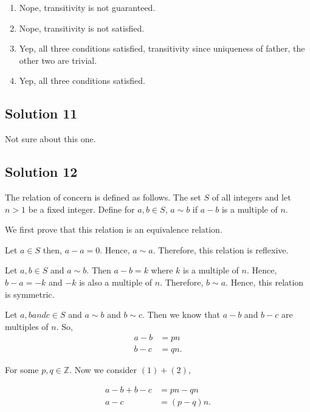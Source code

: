\begin{enumerate}
 \item  Nope, transitivity is not guaranteed.

    \item Nope, transitivity is not satisfied.

\item     Yep, all three conditions satisfied, transitivity since uniqueness of father, the other two are trivial.


\item    Yep, all three conditions satisfied.  
 
\end{enumerate}

 

 \subsection{Solution 11}

 Not sure about this one.

 \subsection{Solution 12}

 The relation of concern is defined as follows. The set \( S \) of all integers
 and let \(  n > 1\) be a fixed integer. Define for \( a, b \in S \), \( a \sim  b \) if \( a - b \) is a 
 multiple of \( n \).

 We first prove that this relation is an equivalence relation.

 Let \( a \in  S \) then, \( a - a = 0\). Hence, \( a \sim a \). Therefore, this relation
 is reflexive.

 Let \( a, b \in S \) and \( a \sim  b \). Then \( a - b = k\) where \( k  \) is a multiple
 of \( n \). Hence, \( b - a = - k\) and \( -k \) is also a multiple of \( n \).  
 Therefore, \( b \sim a   \). Hence, this relation is symmetric. 

 Let \( a,b and c \in  S\) and \( a \sim b \) and \( b \sim c \). Then we know that
 \( a - b  \) and \( b - c \) are multiples of \( n \).
 So,
 \begin{align}
   a - b &= pn \\
   b - c &= qn
 .\end{align}

 For some \( p,q \in \mathbb{Z} \). Now we consider $(1) + (2)$, 

 \begin{align*}
   a - b + b - c &= pn - qn\\ 
   a - c &= \left( p - q \right)n
 .\end{align*}

